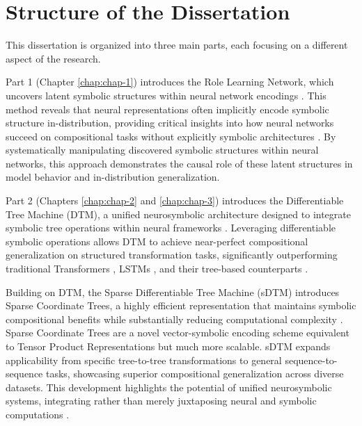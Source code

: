 
\section{Structure of the Dissertation}
This dissertation is organized into three main parts, each focusing on a different aspect of the research. 

Part 1 (Chapter \ref{chap:chap-1}) introduces the Role Learning Network, which uncovers latent symbolic structures within neural network encodings \citep{soulos2020discovering}. This method reveals that neural representations often implicitly encode symbolic structure in-distribution, providing critical insights into how neural networks succeed on compositional tasks without explicitly symbolic architectures \citep{mccoy2018rnns}. By systematically manipulating discovered symbolic structures within neural networks, this approach demonstrates the causal role of these latent structures in model behavior and in-distribution generalization. 

Part 2 (Chapters \ref{chap:chap-2} and \ref{chap:chap-3}) introduces the Differentiable Tree Machine (DTM), a unified neurosymbolic architecture designed to integrate symbolic tree operations within neural frameworks \citep{pmlr-v202-soulos23a,soulos2024compositional}. Leveraging differentiable symbolic operations allows DTM to achieve near-perfect compositional generalization on structured transformation tasks, significantly outperforming traditional Transformers \citep{vaswani2017attention}, LSTMs \citep{hochreiter_long_1997}, and their tree-based counterparts \citep{tai2015improved,dong2016language,NEURIPS2018_d759175d,shiv_novel_2019}.

Building on DTM, the Sparse Differentiable Tree Machine (sDTM) introduces Sparse Coordinate Trees, a highly efficient representation that maintains symbolic compositional benefits while substantially reducing computational complexity \citep{soulos2024compositional}. Sparse Coordinate Trees are a novel vector-symbolic encoding scheme equivalent to Tensor Product Representations but much more scalable. sDTM expands applicability from specific tree-to-tree transformations to general sequence-to-sequence tasks, showcasing superior compositional generalization across diverse datasets. This development highlights the potential of unified neurosymbolic systems, integrating rather than merely juxtaposing neural and symbolic computations \citep{gayler2003vsa_jackendoff,Smolensky1990TensorPV}.

